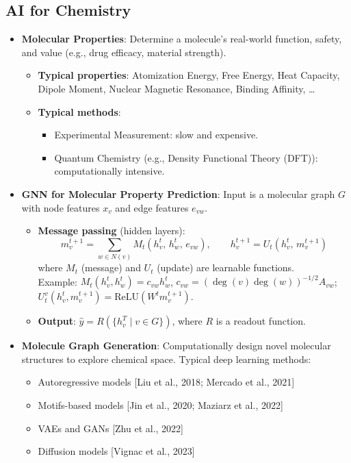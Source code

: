 \documentclass[UTF8]{ctexart}
\begin{document}
\subsection{AI for Chemistry}
\begin{itemize}
    \item \textbf{Molecular Properties}: Determine a molecule's real-world function, safety, and value (e.g., drug efficacy, material strength).
    \begin{itemize}
        \item \textbf{Typical properties}: Atomization Energy, Free Energy, Heat Capacity, Dipole Moment, Nuclear Magnetic Resonance, Binding Affinity, \ldots
        \item \textbf{Typical methods}:
        \begin{itemize}
            \item Experimental Measurement: slow and expensive.
            \item Quantum Chemistry (e.g., Density Functional Theory (DFT)): computationally intensive.
        \end{itemize}
    \end{itemize}

    \item \textbf{GNN for Molecular Property Prediction}: Input is a molecular graph $G$ with node features $x_v$ and edge features $e_{vw}$.
    \begin{itemize}
        \item \textbf{Message passing} (hidden layers):
        \[
            m_v^{t+1} = \sum_{w \in N(v)} M_t\!\left(h_v^t,\, h_w^t,\, e_{vw}\right), \qquad
            h_v^{t+1} = U_t\!\left(h_v^t,\, m_v^{t+1}\right)
        \]
        where $M_t$ (message) and $U_t$ (update) are learnable functions. \\
        Example:
        $M_t(h_v^t, h_w^t) = c_{vw} h_w^t$, $c_{vw} = (\deg(v)\deg(w))^{-1/2} A_{vw}$;
        $U_t^v(h_v^t, m_v^{t+1}) = \mathrm{ReLU}(W^t m_v^{t+1})$.
        \item \textbf{Output}: $\hat{y} = R\!\left(\{h_v^T \mid v \in G\}\right)$, where $R$ is a readout function.
    \end{itemize}

    \item \textbf{Molecule Graph Generation}: Computationally design novel molecular structures to explore chemical space. Typical deep learning methods:
    \begin{itemize}
        \item Autoregressive models [Liu et al., 2018; Mercado et al., 2021]
        \item Motifs-based models [Jin et al., 2020; Maziarz et al., 2022]
        \item VAEs and GANs [Zhu et al., 2022]
        \item Diffusion models [Vignac et al., 2023]
    \end{itemize}
\end{itemize}
\end{document}
